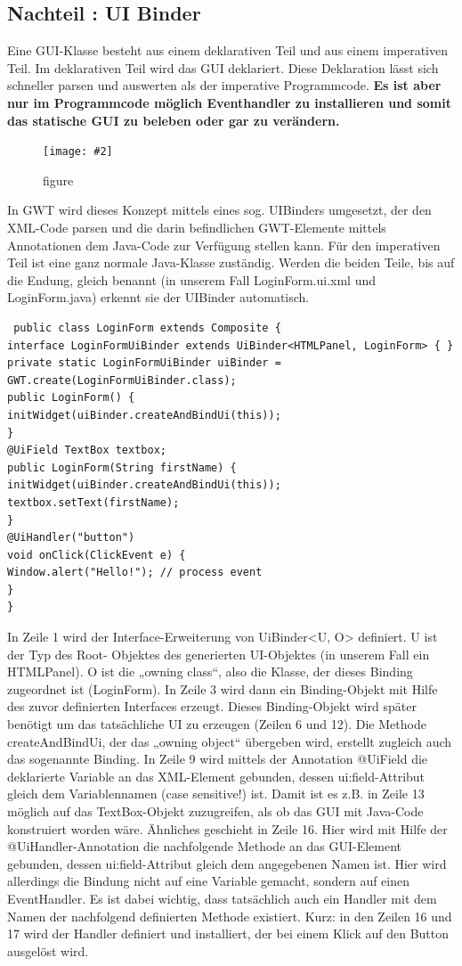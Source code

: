 \documentclass[a4paper,10pt]{scrreprt}
\newcommand{\pic}[2][figure]{\begin{figure}[h]
 \centering
 \texttt{[image: \#2]}
 \caption{#1}
\end{figure}
}
\begin{document}
\subsection{Nachteil : UI Binder}
Eine GUI-Klasse besteht aus einem deklarativen Teil und aus einem imperativen Teil. Im deklarativen
Teil wird das GUI deklariert. Diese Deklaration lässt sich schneller parsen und auswerten als der
imperative Programmcode. \textbf{Es ist aber nur im Programmcode möglich Eventhandler zu installieren und
somit das statische GUI zu beleben oder gar zu verändern.}

\pic{uibinder.png}

In GWT wird dieses Konzept mittels eines sog. UIBinders umgesetzt, der den XML-Code parsen und die
darin befindlichen GWT-Elemente mittels Annotationen dem Java-Code zur Verfügung stellen kann.
Für den imperativen Teil ist eine ganz normale Java-Klasse zuständig. Werden die beiden Teile, bis auf
die Endung, gleich benannt (in unserem Fall LoginForm.ui.xml und LoginForm.java) erkennt sie der
UIBinder automatisch.

\begin{lstlisting}
 public class LoginForm extends Composite {
interface LoginFormUiBinder extends UiBinder<HTMLPanel, LoginForm> { }
private static LoginFormUiBinder uiBinder = GWT.create(LoginFormUiBinder.class);
public LoginForm() {
initWidget(uiBinder.createAndBindUi(this));
}
@UiField TextBox textbox;
public LoginForm(String firstName) {
initWidget(uiBinder.createAndBindUi(this));
textbox.setText(firstName);
}
@UiHandler("button")
void onClick(ClickEvent e) {
Window.alert("Hello!"); // process event
}
}
\end{lstlisting}

In Zeile 1 wird der Interface-Erweiterung von UiBinder<U, O> definiert. U ist der Typ des Root-
Objektes des generierten UI-Objektes (in unserem Fall ein HTMLPanel). O ist die „owning class“, also
die Klasse, der dieses Binding zugeordnet ist (LoginForm).
In Zeile 3 wird dann ein Binding-Objekt mit Hilfe des zuvor definierten Interfaces erzeugt. Dieses
Binding-Objekt wird später benötigt um das tatsächliche UI zu erzeugen (Zeilen 6 und 12). Die
Methode createAndBindUi, der das „owning object“ übergeben wird, erstellt zugleich auch das
sogenannte Binding.
In Zeile 9 wird mittels der Annotation @UiField die deklarierte Variable an das XML-Element
gebunden, dessen ui:field-Attribut gleich dem Variablennamen (case sensitive!) ist. Damit ist es
z.B. in Zeile 13 möglich auf das TextBox-Objekt zuzugreifen, als ob das GUI mit Java-Code konstruiert
worden wäre.
Ähnliches geschieht in Zeile 16. Hier wird mit Hilfe der @UiHandler-Annotation die nachfolgende
Methode an das GUI-Element gebunden, dessen ui:field-Attribut gleich dem angegebenen
Namen ist. Hier wird allerdings die Bindung nicht auf eine Variable gemacht, sondern auf einen
EventHandler. Es ist dabei wichtig, dass tatsächlich auch ein Handler mit dem Namen der nachfolgend
definierten Methode existiert.
Kurz: in den Zeilen 16 und 17 wird der Handler definiert und installiert, der bei einem Klick auf den
Button ausgelöst wird.
\end{document}
